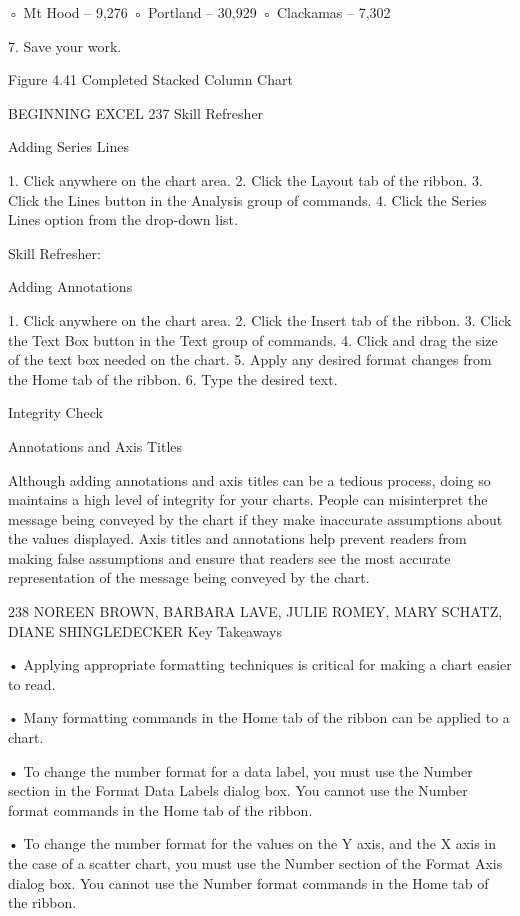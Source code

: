 ◦ Mt Hood – 9,276
◦ Portland – 30,929
◦ Clackamas – 7,302

7. Save your work.




Figure 4.41 Completed Stacked Column Chart




BEGINNING EXCEL 237
Skill Refresher


Adding Series Lines

1. Click anywhere on the chart area.
2. Click the Layout tab of the ribbon.
3. Click the Lines button in the Analysis group of commands.
4. Click the Series Lines option from the drop-down list.




Skill Refresher:


Adding Annotations

1. Click anywhere on the chart area.
2. Click the Insert tab of the ribbon.
3. Click the Text Box button in the Text group of commands.
4. Click and drag the size of the text box needed on the chart.
5. Apply any desired format changes from the Home tab of the ribbon.
6. Type the desired text.




Integrity Check

Annotations and Axis Titles

Although adding annotations and axis titles can be a tedious process, doing so maintains a high level of integrity for
your charts. People can misinterpret the message being conveyed by the chart if they make inaccurate assumptions
about the values displayed. Axis titles and annotations help prevent readers from making false assumptions and
ensure that readers see the most accurate representation of the message being conveyed by the chart.




238 NOREEN BROWN, BARBARA LAVE, JULIE ROMEY, MARY SCHATZ, DIANE SHINGLEDECKER
Key Takeaways


• Applying appropriate formatting techniques is critical for making a chart easier to read.

• Many formatting commands in the Home tab of the ribbon can be applied to a chart.

• To change the number format for a data label, you must use the Number section in the Format Data Labels
dialog box. You cannot use the Number format commands in the Home tab of the ribbon.

• To change the number format for the values on the Y axis, and the X axis in the case of a scatter chart, you
must use the Number section of the Format Axis dialog box. You cannot use the Number format commands
in the Home tab of the ribbon.

